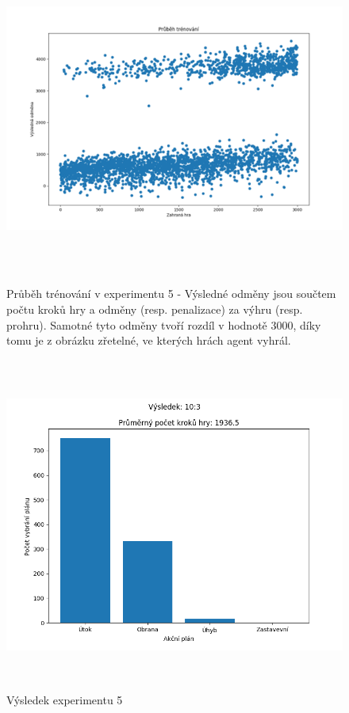 \begin{figure}[p]\centering
\includegraphics[width=145mm, height=110mm]{./Obrazky/Experiment05Training.png}
\caption{Průběh trénování v experimentu 5 - Výsledné odměny jsou součtem počtu kroků hry a odměny (resp. penalizace) za výhru (resp. prohru). Samotné tyto odměny tvoří rozdíl v hodnotě 3000, díky tomu je z obrázku zřetelné, ve kterých hrách agent vyhrál.}
\label{Průběh trénování experimentu 06}
\end{figure}




\begin{figure}[p]\centering
\includegraphics[width=145mm, height=110mm]{./Obrazky/Experiment05Results.png}
\caption{Výsledek experimentu 5}
\label{Průběh trénování experimentu 06}
\end{figure}


